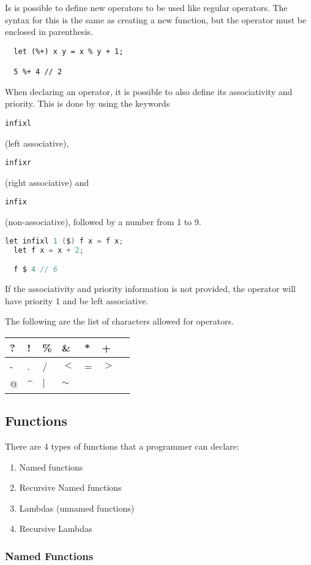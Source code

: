 \documentclass{article}
\def\code#1{\begin{footnotesize}\texttt{#1}\end{footnotesize}}
\begin{document}
Is is possible to define new operators to be used like regular operators.
The syntax for this is the same as creating a new function, but the operator must be enclosed in parenthesis.

\begin{lstlisting}
  let (%+) x y = x % y + 1;

  5 %+ 4 // 2
\end{lstlisting}

When declaring an operator, it is possible to also define its associativity and priority.
This is done by using the keywords \code{infixl} (left associative), \code{infixr} (right associative) and \code{infix} (non-associative), followed by a number from 1 to 9.

\begin{lstlisting}[language=V]
  let infixl 1 ($) f x = f x;
  let f x = x + 2;

  f $ 4 // 6
\end{lstlisting}

If the associativity and priority information is not provided, the operator will have priority 1 and be left associative.

The following are the list of characters allowed for operators.

\smallskip

\begin{tabular}{|l|l|l|l|l|l|l|}
  \hline
  ? & ! & \% & \& & * & +\\
  \hline
  - & . & / & $<$ & = & $>$\\
  \hline
  @ & \textasciicircum & $|$ & $\sim$\\
  \hline
\end{tabular}

\subsection{Functions}

There are 4 types of functions that a programmer can declare:

\begin{enumerate}
  \item Named functions
  \item Recursive Named functions
  \item Lambdas (unnamed functions)
  \item Recursive Lambdas
\end{enumerate}

\subsubsection{Named Functions}
\end{document}
